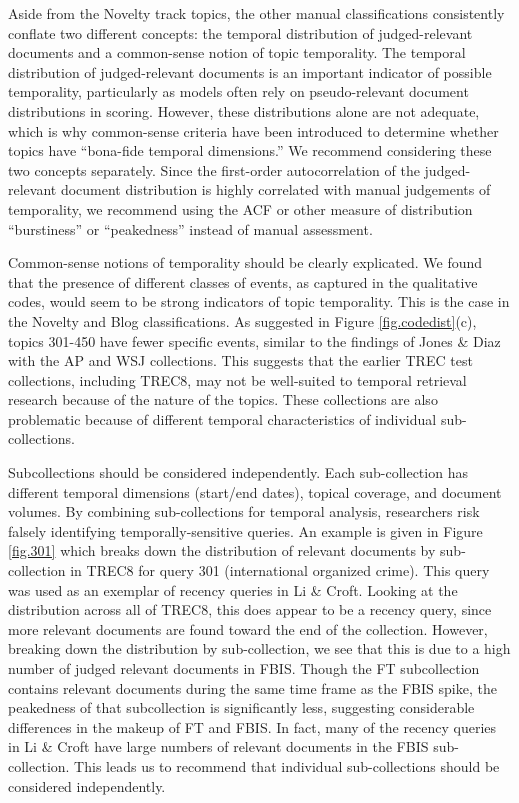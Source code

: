 \documentclass[runningheads,a4paper]{llncs}
\begin{document}
Aside from the Novelty track topics, the other manual classifications consistently conflate two different concepts: the temporal distribution of judged-relevant documents and a common-sense notion of topic temporality. The temporal distribution of judged-relevant documents is an important indicator of possible temporality, particularly as models often rely on pseudo-relevant document distributions in scoring. However, these distributions alone are not adequate, which is why common-sense criteria have been introduced to determine whether topics have ``bona-fide temporal dimensions.'' We recommend considering these two concepts separately.  Since the first-order autocorrelation of the judged-relevant document distribution is highly correlated with manual judgements of temporality, we recommend using the ACF or other measure of distribution ``burstiness'' or ``peakedness'' instead of manual assessment.  

Common-sense notions of temporality should be clearly explicated.  We found that the presence of different classes of events, as captured in the qualitative codes, would seem to be strong indicators of topic temporality.  This is the case in the Novelty and Blog classifications. As suggested in Figure \ref{fig.codedist}(c), topics 301-450 have fewer specific events, similar to the findings of Jones \& Diaz with the AP and WSJ collections. This suggests that the earlier TREC test collections, including TREC8, may not be well-suited to temporal retrieval research because of the nature of the topics. These collections are also problematic because of different temporal characteristics of individual sub-collections.

Subcollections should be considered independently. Each sub-collection has different temporal dimensions (start/end dates), topical coverage, and document volumes. By combining sub-collections for temporal analysis, researchers risk falsely identifying temporally-sensitive queries. An example is given in Figure \ref{fig.301} which breaks down the distribution of relevant documents by sub-collection in TREC8 for query 301 (international organized crime). This query was used as an exemplar of recency queries in Li \& Croft. Looking at the distribution across all of TREC8, this does appear to be a recency query, since more relevant documents are found toward the end of the collection. However, breaking down the distribution by sub-collection, we see that this is due to a high number of judged relevant documents in FBIS. Though the FT subcollection contains relevant documents during the same time frame as the FBIS spike, the peakedness of that subcollection is significantly less, suggesting considerable differences in the makeup of FT and FBIS. In fact, many of the recency queries in Li \& Croft have large numbers of relevant documents in the FBIS sub-collection.    This leads us to recommend that individual sub-collections should be considered independently.
\end{document}
